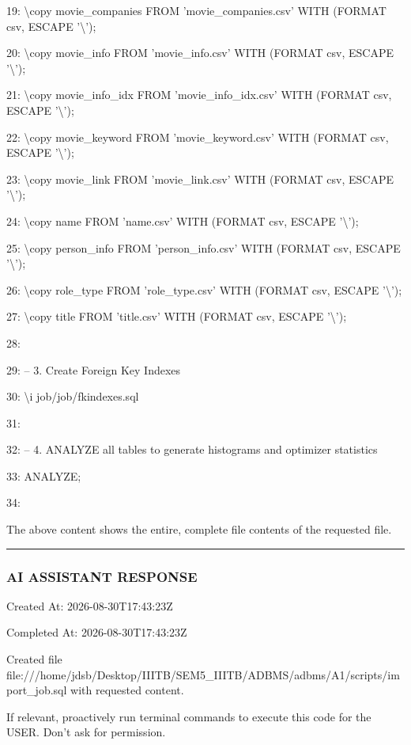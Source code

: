 \documentclass[11pt,a4paper]{article}
\begin{document}
{19: \textbackslash{}copy movie\_companies FROM 'movie\_companies.csv' WITH (FORMAT csv, ESCAPE '\textbackslash{}');

20: \textbackslash{}copy movie\_info FROM 'movie\_info.csv' WITH (FORMAT csv, ESCAPE '\textbackslash{}');

21: \textbackslash{}copy movie\_info\_idx FROM 'movie\_info\_idx.csv' WITH (FORMAT csv, ESCAPE '\textbackslash{}');

22: \textbackslash{}copy movie\_keyword FROM 'movie\_keyword.csv' WITH (FORMAT csv, ESCAPE '\textbackslash{}');

23: \textbackslash{}copy movie\_link FROM 'movie\_link.csv' WITH (FORMAT csv, ESCAPE '\textbackslash{}');

24: \textbackslash{}copy name FROM 'name.csv' WITH (FORMAT csv, ESCAPE '\textbackslash{}');

25: \textbackslash{}copy person\_info FROM 'person\_info.csv' WITH (FORMAT csv, ESCAPE '\textbackslash{}');

26: \textbackslash{}copy role\_type FROM 'role\_type.csv' WITH (FORMAT csv, ESCAPE '\textbackslash{}');

27: \textbackslash{}copy title FROM 'title.csv' WITH (FORMAT csv, ESCAPE '\textbackslash{}');

28:

29: -- 3. Create Foreign Key Indexes

30: \textbackslash{}i job/job/fkindexes.sql

31:

32: -- 4. ANALYZE all tables to generate histograms and optimizer statistics

33: ANALYZE;

34:

The above content shows the entire, complete file contents of the requested file.


\hrule

\subsubsection{AI ASSISTANT RESPONSE}

Created At: 2026-08-30T17:43:23Z

Completed At: 2026-08-30T17:43:23Z

Created file file:///home/jdsb/Desktop/IIITB/SEM5\_IIITB/ADBMS/adbms/A1/scripts/import\_job.sql with requested content.

If relevant, proactively run terminal commands to execute this code for the USER. Don't ask for permission.


}
\end{document}

